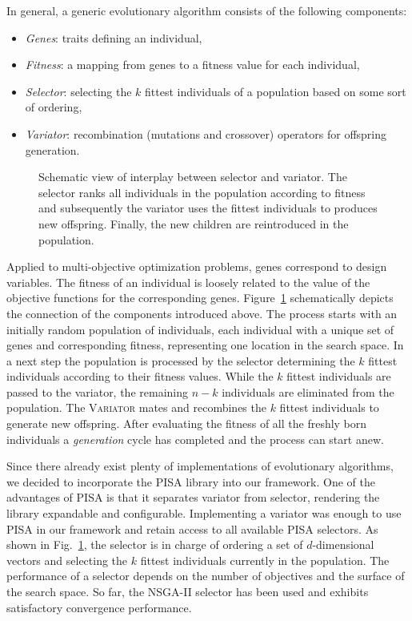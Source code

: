 \documentclass[%
reprint,
amsmath,amssymb,
aps,
prstab,
]{revtex4-1}
\begin{document}
In general, a generic evolutionary algorithm consists of the following
  components:
%
\begin{itemize}
  \item \textit{Genes}: traits defining an individual,
  \item \textit{Fitness}: a mapping from genes to a fitness value for each
    individual,
  \item \textit{Selector}: selecting the $k$ fittest individuals of a
    population based on some sort of ordering,
  \item \textit{Variator}: recombination (mutations and crossover) operators
    for offspring generation.
\end{itemize}

\begin{figure}
    \centering
    \scalebox{1}{
    \begin{tikzpicture}[scale=0.8, transform shape, text=black]
    
    \end{tikzpicture}
	}
  \caption{Schematic view of interplay between selector and variator. The
  selector ranks all individuals in the population according to fitness and
  subsequently the variator uses the fittest individuals to produces new
  offspring. Finally, the new children are reintroduced in the population.}
  \label{fig:varsel}
\end{figure}

Applied to multi-objective optimization problems, genes correspond to
  design variables.
The fitness of an individual is loosely related to the value of the objective
  functions for the corresponding genes.
Figure~\ref{fig:varsel} schematically depicts the connection of the
  components introduced above.
The process starts with an initially random population of individuals, each
  individual with a unique set of genes and corresponding fitness,
  representing one location in the search space.
In a next step the population is processed by the selector
  determining the $k$ fittest individuals according to their fitness values.
While the $k$ fittest individuals are passed to the variator, the
  remaining $n-k$ individuals are eliminated from the population.
The \textsc{Variator} mates and recombines the $k$ fittest individuals to
  generate new offspring.
After evaluating the fitness of all the freshly born individuals a
  \textit{generation} cycle has completed and the process can start anew.

Since there already exist plenty of implementations of evolutionary algorithms,
  we decided to incorporate the PISA library \cite{pisa} into our
  framework.
One of the advantages of PISA is that it separates variator from selector,
  rendering the library expandable and configurable.
Implementing a variator was enough to use PISA in our framework and
  retain access to all available PISA selectors.
As shown in Fig.~\ref{fig:varsel}, the selector is in charge of ordering a
  set of $d$-dimensional vectors and selecting the $k$ fittest individuals
  currently in the population.
The performance of a selector depends on the number of objectives and the
  surface of the search space.
So far, the NSGA-II selector \cite{dpam:02} has been used and exhibits satisfactory
  convergence performance.
\end{document}
